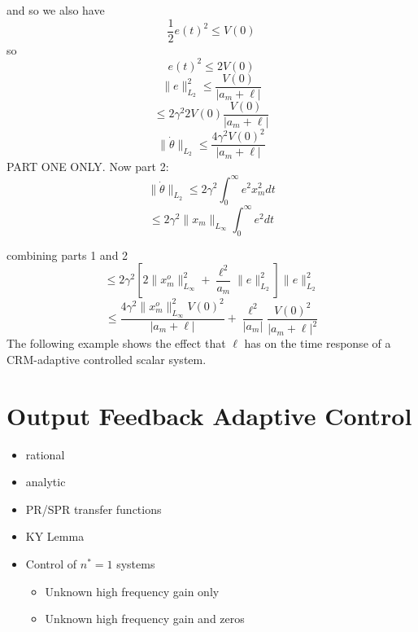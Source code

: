 and so we also have
\begin{equation*}
  \frac{1}{2}e(t)^{2}\leq V(0)
\end{equation*}
so
\begin{equation*}
  e(t)^{2}\leq 2V(0)
\end{equation*}
\begin{equation*}
  \|e\|_{L_{2}}^{2}\leq\frac{V(0)}{|a_{m}+\ell|}
\end{equation*}
\begin{equation*}
  \leq2\gamma^{2}2V(0)\frac{V(0)}{|a_{m}+\ell|}
\end{equation*}
\begin{equation*}
  \|\dot{\theta}\|_{L_{2}}\leq\frac{4\gamma^{2}V(0)^{2}}{|a_{m}+\ell|}
\end{equation*}
PART ONE ONLY.\@
Now part 2:
\begin{equation*}
  \|\dot{\theta}\|_{L_{2}}\leq2\gamma^{2}\int_{0}^{\infty}e^{2}x_{m}^{2}dt
\end{equation*}
\begin{equation*}
  \leq2\gamma^{2}\|x_{m}\|_{L_{\infty}}\int_{0}^{\infty}e^{2}dt
\end{equation*}

combining parts 1 and 2
\begin{equation*}
  \leq2\gamma^{2}\left[2\|x_{m}^{o}\|_{L_{\infty}}^{2}+\frac{\ell^{2}}{a_{m}}\|e\|_{L_{2}}^{2}\right]\|e\|_{L_{2}}^{2}
\end{equation*}
\begin{equation*}
  \leq\frac{4\gamma^{2}\|x_{m}^{o}\|_{L_{\infty}}^{2}V(0)^{2}}{|a_{m}+\ell|}+\frac{\ell^{2}}{|a_{m}|}\frac{V(0)^{2}}{|a_{m}+\ell|^{2}}
\end{equation*}
The following example shows the effect that $\ell$ has on the time response of a CRM-adaptive controlled scalar system.

\chapter{Output Feedback Adaptive Control}

\begin{itemize}
  \setlength{\itemsep}{0pt}
  \item{rational}
  \item{analytic}
  \item{PR/SPR transfer functions}
  \item{KY Lemma}
  \item{Control of $n^{*}=1$ systems}
  \begin{itemize}
    \item{Unknown high frequency gain only}
    \item{Unknown high frequency gain and zeros}
  \end{itemize}
\end{itemize}

